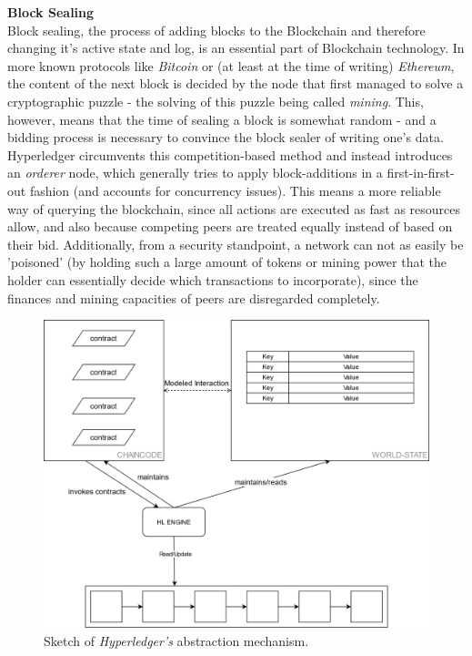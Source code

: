 \textbf{Block Sealing} \\[0.2em]
Block sealing, the process of adding blocks to the Blockchain and therefore changing it's active state and log, is an essential part of Blockchain technology. In more known protocols like \emph{Bitcoin} or (at least at the time of writing) \emph{Ethereum}, the content of the next block is decided by the node that first managed to solve a cryptographic puzzle - the solving of this puzzle being called \emph{mining}. This, however, means that the time of sealing a block is somewhat random - and a bidding process is necessary to convince the block sealer of writing one's data. \newline
Hyperledger circumvents this competition-based method and instead introduces an \emph{orderer} node, which generally tries to apply block-additions in a first-in-first-out fashion (and accounts for concurrency issues). This means a more reliable way of querying the blockchain, since all actions are executed as fast as resources allow, and also because competing peers are treated equally instead of based on their bid. \newline
Additionally, from a security standpoint, a network can not as easily be 'poisoned' (by holding such a large amount of tokens or mining power that the holder can essentially decide which transactions to incorporate), since the finances and mining capacities of peers are disregarded completely.

\begin{figure}[h]
	\centering
	\captionsetup{justification=centering,margin=2cm}
	\includegraphics[height=0.7\textwidth]{gfx/hl-abstraction}
	\caption{Sketch of \emph{Hyperledger's} abstraction mechanism.}
	\label{fig:impr:hl:basics:abstraction}
\end{figure}

